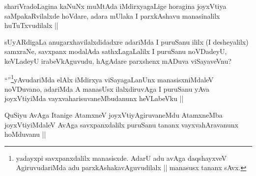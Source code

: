 \begin{artha}
shariVradoLagina kaNuNx muMtAda iMdirxyagaLige horagina  joyxVtiya saMpakaRvilalxde hoVdare, adara mUlaka I parxkAshavu manasinalilx huTuTxvudilalx ||
\end{artha}

\begin{artha}
sUyARdigaLa anugarxhavilalxdidadxre adariMda I puruSanu ililx (I desheyalilx) samxraNe, savxpanx modalAda sathxLagaLalilx I puruSanu noVDadeyU, keVLadeyU irabeVkAguvudu, hAgAdare parxshenx mADuva viSayaveVnu?
\end{artha}

\begin{artha}
``\stext''\footnote[1]{yadayxpi savxpanxdalilx manasisxde. AdarU adu avAga daqshayxveV AgiruvudariMda adu parxkAshakavAguvudilalx || manasusx tananx sAvx.}yAvudariMda elAlx iMdirxya viSayagaLanUnx manasisxniMdaleV noVDuvano, adariMda A manasUsx ilalxdiruvAga I puruSanu yAva joyxVtiyiMda vayxvaharisuvaneMbudanunx heVLabeVku ||
\end{artha}

\begin{artha}
  QuSiyu AvAga Itanige AtamxneV joyxVtiyAgiruvaneMdu AtamxneMba joyxVtiyiMdaleV AvAga savxpanxdalilx puruSanu tananx vayxvahAravanunx hoMduvanu ||
\end{artha}

\begin{artha}

\end{artha}

